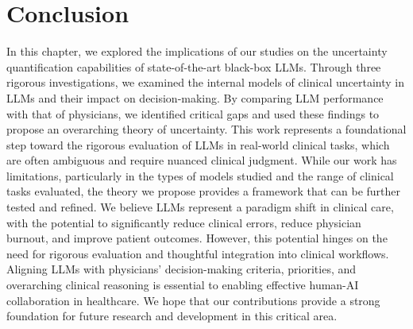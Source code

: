 \section{Conclusion}
In this chapter, we explored the implications of our studies on the uncertainty quantification capabilities of state-of-the-art black-box LLMs. Through three rigorous investigations, we examined the internal models of clinical uncertainty in LLMs and their impact on decision-making. By comparing LLM performance with that of physicians, we identified critical gaps and used these findings to propose an overarching theory of uncertainty. This work represents a foundational step toward the rigorous evaluation of LLMs in real-world clinical tasks, which are often ambiguous and require nuanced clinical judgment. While our work has limitations, particularly in the types of models studied and the range of clinical tasks evaluated, the theory we propose provides a framework that can be further tested and refined. We believe LLMs represent a paradigm shift in clinical care, with the potential to significantly reduce clinical errors, reduce physician burnout, and improve patient outcomes. However, this potential hinges on the need for rigorous evaluation and thoughtful integration into clinical workflows. Aligning LLMs with physicians' decision-making criteria, priorities, and overarching clinical reasoning is essential to enabling effective human-AI collaboration in healthcare. We hope that our contributions provide a strong foundation for future research and development in this critical area.